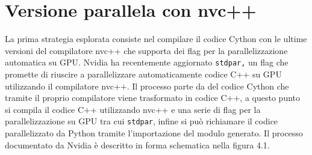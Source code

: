 \documentclass[12pt,a4paper]{report}
\begin{document}
\chapter{Versione parallela con nvc++} 
La prima strategia esplorata consiste nel compilare il codice Cython con le ultime versioni del compilatore nvc++ che supporta dei flag per la parallelizzazione automatica su GPU.  Nvidia ha recentemente aggiornato \verb|stdpar,|  un flag che promette di riuscire a parallelizzare automaticamente codice C++ su GPU utilizzando il compilatore nvc++. \newline
Il processo parte da del codice Cython che tramite il proprio compilatore viene trasformato in codice C++,  a questo punto si compila il codice C++ utilizzando nvc++ e una serie di flag per la parallelizzazione su GPU tra cui \verb|stdpar|, infine si può richiamare il codice parallelizzato da Python tramite l'importazione del modulo generato. \newline
Il processo documentato da Nvidia è descritto in forma schematica nella figura 4.1.
\begin{figure}[H]
\centering
\begin{floatrow}[1]
\end{floatrow}
\end{figure} \newpage
\end{document}
